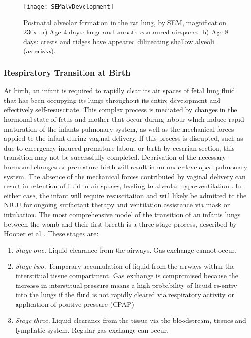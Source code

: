 \documentclass[12pt, openany, oneside]{book}
\begin{document}
\begin{figure}
	\begin{center}
	
	\texttt{[image: SEMalvDevelopment]}
	\label{fig:alv}
	\caption[Postnatal alveolar formation in the rat lung]{Postnatal alveolar formation in the rat lung, by SEM, magnification 230x. a) Age 4 days: large and smooth contoured airspaces. b) Age 8 days: crests and ridges have appeared dilineating shallow alveoli (asterisks). \citep{burri1984fetal}} 

	
	\end{center}

\end{figure}




\subsubsection{Respiratory Transition at Birth}
At birth, an infant is required to rapidly clear its air spaces of fetal lung fluid that has been occupying its lungs throughout its entire development and effectively self-resuscitate. This complex process is mediated by changes in the hormonal state of fetus and mother that occur during labour which induce rapid maturation of the infants pulmonary system, as well as the mechanical forces applied to the infant during vaginal delivery. If this process is disrupted, such as due to emergency induced premature labour or birth by cesarian section, this transition may not be successfully completed. Deprivation of the necessary hormonal changes or premature birth will result in an underdeveloped pulmonary system. The absence of the mechanical forces contributed by vaginal delivery can result in retention of fluid in air spaces, leading to alveolar hypo-ventilation \cite{jain2006physiology}. In either case, the infant will require resuscitation and will likely be admitted to the NICU for ongoing surfactant therapy and ventilation assistance via mask or intubation.
The most comprehensive model of the transition of an infants lungs between the womb and their first breath is a three stage process, described by Hooper et al \cite{hooper2016}. These stages are:
\begin{enumerate}
\item{\textit{Stage one.}} Liquid clearance from the airways. Gas exchange cannot occur.
\item {\textit{Stage two.}} Temporary accumulation of liquid from the airways within the interstitual tissue compartment. Gas exchange is compromised because the increase in interstitual pressure means a high probability of liquid re-entry into the lungs if the fluid is not rapidly cleared via respiratory activity or application of positive pressure (CPAP)
\item{\textit{Stage three.}} Liquid clearance from the tissue via the bloodstream, tissues and lymphatic system. Regular gas exchange can occur.
\end{enumerate}
\end{document}
